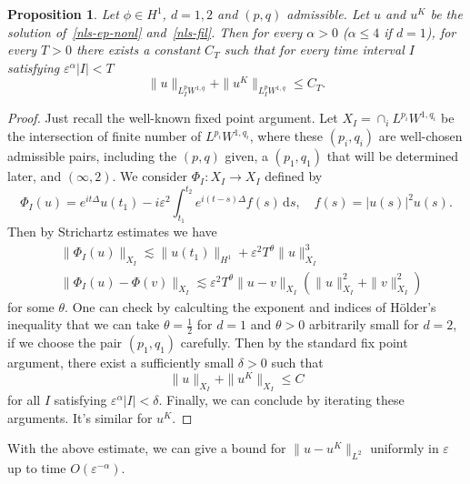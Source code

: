 \documentclass[10pt,a4paper]{article}
\newtheorem{proposition}[theorem]{Proposition}
\begin{document}

  \begin{proposition}
    Let \(\phi\in H^1\), \(d=1,2\) and \((p,q)\) admissible. Let \(u\) and \(u^K\) be the solution 
    of~\eqref{nls-ep-nonl} and~\eqref{nls-fil}. Then for every \(\alpha>0\) (\(\alpha
    \leq 4\) if \(d=1\)), for every \(T>0\) there exists a constant \(C_T\) such that for every
    time interval \(I\) satisfying \(\varepsilon^\alpha|I|<T\)
    \[ \|u\|_{L^p_I W^{1,q}} + \|u^K\|_{L^p_I W^{1,q}} \leq C_T. \]
  \end{proposition}

  \begin{proof}
    Just recall the well-known fixed point argument. Let \(X_I=\cap_i L^{p_i} W^{1,q_i}\) 
    be the intersection of finite number of \(L^{p_i} W^{1,q_i}\), where these \((p_i,q_i)\) are 
    well-chosen admissible pairs, including the \((p,q)\) given, a \((p_1,q_1)\)
    that will be determined later, and \((\infty,2)\). We consider 
    \(\Phi_I: X_I \to X_I\) 
    defined by
    \[ \Phi_I(u) = e^{it\Delta} u(t_1) - i\varepsilon^2 \int_{t_1}^{t_2} e^{i(t-s)\Delta}
    f(s)\,\mathrm{d}s, \quad f(s)=|u(s)|^2u(s). \]
    Then by Strichartz estimates we have
    \begin{equation}
      \begin{aligned}
        & \|\Phi_I(u)\|_{X_I} \lesssim \|u(t_1)\|_{H^1} + \varepsilon^2
        T^\theta \|u\|_{X_I}^3 \\
        & \|\Phi_I(u)-\Phi(v)\|_{X_I} \lesssim \varepsilon^2
        T^\theta \|u-v\|_{X_I} (\|u\|_{X_I}^2 + \|v\|_{X_I}^2) 
      \end{aligned}
    \end{equation}
    for some \(\theta\). One can check by calculting the exponent and indices of
    H\"older's inequality that we can take
    \(\theta=\frac12\) for \(d=1\) and \(\theta>0\) arbitrarily small for \(d=2\),
    if we choose the pair \((p_1,q_1)\) carefully.
    Then by the standard fix point argument, there exist a sufficiently small
    \(\delta>0\) such that 
    \[ \|u\|_{X_I} + \|u^K\|_{X_I} \leq C \]
    for all \(I\) satisfying \(\varepsilon^\alpha|I|<\delta\). Finally, we can
    conclude by iterating these arguments. It's similar for \(u^K\).
  \end{proof}

  With the above estimate, we can give a bound for \(\|u-u^K\|_{L^2}\) uniformly
  in \(\varepsilon\) up to time \(O(\varepsilon^{-\alpha})\).
\end{document}
